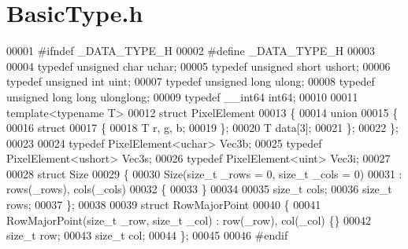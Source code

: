 \section{Basic\-Type.\-h}
\label{_basic_type_8h}

\begin{DoxyCode}
00001 \textcolor{preprocessor}{#ifndef \_DATA\_TYPE\_H}
00002 \textcolor{preprocessor}{}\textcolor{preprocessor}{#define \_DATA\_TYPE\_H}
00003 \textcolor{preprocessor}{}
00004 \textcolor{keyword}{typedef} \textcolor{keywordtype}{unsigned} \textcolor{keywordtype}{char} uchar;
00005 \textcolor{keyword}{typedef} \textcolor{keywordtype}{unsigned} \textcolor{keywordtype}{short} ushort;
00006 \textcolor{keyword}{typedef} \textcolor{keywordtype}{unsigned} \textcolor{keywordtype}{int} uint;
00007 \textcolor{keyword}{typedef} \textcolor{keywordtype}{unsigned} \textcolor{keywordtype}{long} ulong;
00008 \textcolor{keyword}{typedef} \textcolor{keywordtype}{unsigned} \textcolor{keywordtype}{long} \textcolor{keywordtype}{long} ulonglong;
00009 \textcolor{keyword}{typedef} \_\_int64  int64;
00010 
00011 \textcolor{keyword}{template}<\textcolor{keyword}{typename} T>
00012 \textcolor{keyword}{struct }PixelElement
00013 \{
00014         \textcolor{keyword}{union}
00015         \{
00016                 \textcolor{keyword}{struct}
00017                 \{
00018                         T r, g, b;
00019                 \};
00020                 T data[3];
00021         \};
00022 \};
00023 
00024 \textcolor{keyword}{typedef} PixelElement<uchar> Vec3b;
00025 \textcolor{keyword}{typedef} PixelElement<ushort> Vec3s;
00026 \textcolor{keyword}{typedef} PixelElement<uint> Vec3i;
00027 
00028 \textcolor{keyword}{struct }Size
00029 \{
00030         Size(\textcolor{keywordtype}{size\_t} \_rows = 0, \textcolor{keywordtype}{size\_t} \_cols = 0)
00031                 : rows(\_rows), cols(\_cols)
00032         \{
00033         \}
00034 
00035         \textcolor{keywordtype}{size\_t} cols;
00036         \textcolor{keywordtype}{size\_t} rows;
00037 \};
00038 
00039 \textcolor{keyword}{struct }RowMajorPoint
00040 \{
00041         RowMajorPoint(\textcolor{keywordtype}{size\_t} \_row, \textcolor{keywordtype}{size\_t} \_col) : row(\_row), col(\_col) \{\}
00042         \textcolor{keywordtype}{size\_t} row;
00043         \textcolor{keywordtype}{size\_t} col;
00044 \};
00045 
00046 \textcolor{preprocessor}{#endif}
\end{DoxyCode}
